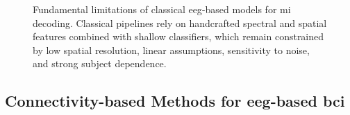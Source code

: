 \begin{figure}[htbp]

\vspace{0.8em}

\caption{Fundamental limitations of classical
\gls{eeg}-based models for \gls{mi} decoding. Classical pipelines
rely on handcrafted spectral and spatial features combined with
shallow classifiers, which remain constrained by low spatial
resolution, linear assumptions, sensitivity to noise, and strong
subject dependence.}
\label{fig:classical_eeg_models}

\end{figure}

\subsection{Connectivity-based Methods for  \gls{eeg}-based \gls{bci}}

